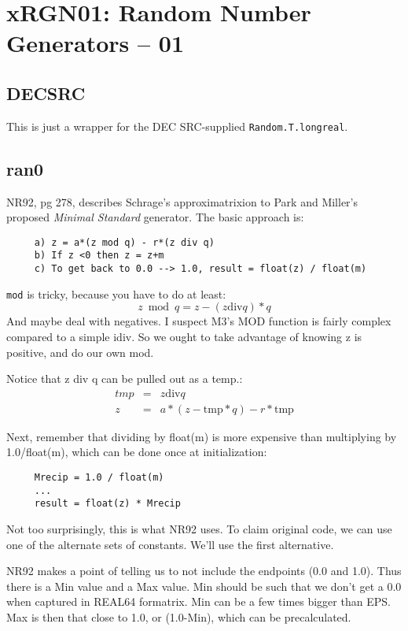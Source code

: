 \section{xRGN01: Random Number Generators -- 01}

\subsection*{DECSRC}
This is just a wrapper for the DEC SRC-supplied {\tt Random.T.longreal}.

\subsection*{ran0}
NR92, pg 278, describes Schrage's approximatrixion to Park and Miller's
proposed {\em Minimal Standard} generator. The basic approach is:
\begin{verbatim}
     a) z = a*(z mod q) - r*(z div q)
     b) If z <0 then z = z+m
     c) To get back to 0.0 --> 1.0, result = float(z) / float(m)
\end{verbatim}
     
{\tt mod} is tricky, because you have to do at least:
\begin{equation}
  z \bmod q = z - (z \mbox{div} q)*q
\end{equation}
And maybe deal with negatives.  I suspect M3's MOD function
is fairly complex compared to a simple idiv.  So we ought to
take advantage of knowing z is positive, and do our own mod.

Notice that z div q can be pulled out as a temp.:
\begin{eqnarray}
     tmp & = & z \mbox{div} q\\
     z & = & a*(z - \mbox{tmp}*q) - r*\mbox{tmp}
\end{eqnarray}

Next, remember that dividing by float(m) is more expensive than
multiplying by 1.0/float(m), which can be done once at
initialization:
\begin{verbatim}
     Mrecip = 1.0 / float(m)
     ...
     result = float(z) * Mrecip
\end{verbatim}
     
Not too surprisingly, this is what NR92 uses.  To claim original
code, we can use one of the alternate sets of constants.
We'll use the first alternative.

NR92 makes a point of telling us to not include the
endpoints (0.0 and 1.0).  Thus there is a Min value and a
Max value.  Min should be such that we don't get a 0.0 when
captured in REAL64 formatrix.  Min can be a few times bigger than EPS.
Max is then that close to 1.0, or (1.0-Min), which can be precalculated.

